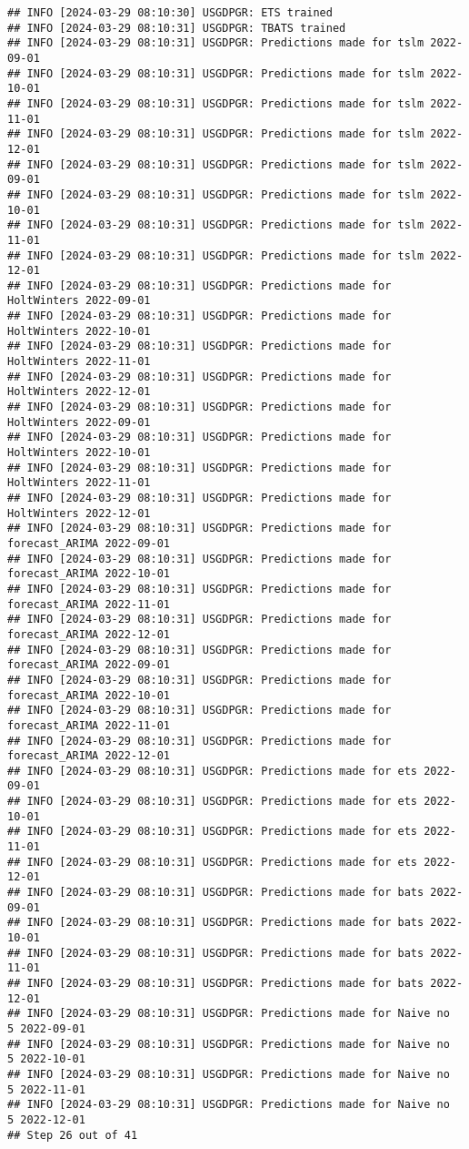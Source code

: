 \documentclass[
]{article}
\begin{document}
\begin{verbatim}
## INFO [2024-03-29 08:10:30] USGDPGR: ETS trained
## INFO [2024-03-29 08:10:31] USGDPGR: TBATS trained
## INFO [2024-03-29 08:10:31] USGDPGR: Predictions made for tslm 2022-09-01
## INFO [2024-03-29 08:10:31] USGDPGR: Predictions made for tslm 2022-10-01
## INFO [2024-03-29 08:10:31] USGDPGR: Predictions made for tslm 2022-11-01
## INFO [2024-03-29 08:10:31] USGDPGR: Predictions made for tslm 2022-12-01
## INFO [2024-03-29 08:10:31] USGDPGR: Predictions made for tslm 2022-09-01
## INFO [2024-03-29 08:10:31] USGDPGR: Predictions made for tslm 2022-10-01
## INFO [2024-03-29 08:10:31] USGDPGR: Predictions made for tslm 2022-11-01
## INFO [2024-03-29 08:10:31] USGDPGR: Predictions made for tslm 2022-12-01
## INFO [2024-03-29 08:10:31] USGDPGR: Predictions made for HoltWinters 2022-09-01
## INFO [2024-03-29 08:10:31] USGDPGR: Predictions made for HoltWinters 2022-10-01
## INFO [2024-03-29 08:10:31] USGDPGR: Predictions made for HoltWinters 2022-11-01
## INFO [2024-03-29 08:10:31] USGDPGR: Predictions made for HoltWinters 2022-12-01
## INFO [2024-03-29 08:10:31] USGDPGR: Predictions made for HoltWinters 2022-09-01
## INFO [2024-03-29 08:10:31] USGDPGR: Predictions made for HoltWinters 2022-10-01
## INFO [2024-03-29 08:10:31] USGDPGR: Predictions made for HoltWinters 2022-11-01
## INFO [2024-03-29 08:10:31] USGDPGR: Predictions made for HoltWinters 2022-12-01
## INFO [2024-03-29 08:10:31] USGDPGR: Predictions made for forecast_ARIMA 2022-09-01
## INFO [2024-03-29 08:10:31] USGDPGR: Predictions made for forecast_ARIMA 2022-10-01
## INFO [2024-03-29 08:10:31] USGDPGR: Predictions made for forecast_ARIMA 2022-11-01
## INFO [2024-03-29 08:10:31] USGDPGR: Predictions made for forecast_ARIMA 2022-12-01
## INFO [2024-03-29 08:10:31] USGDPGR: Predictions made for forecast_ARIMA 2022-09-01
## INFO [2024-03-29 08:10:31] USGDPGR: Predictions made for forecast_ARIMA 2022-10-01
## INFO [2024-03-29 08:10:31] USGDPGR: Predictions made for forecast_ARIMA 2022-11-01
## INFO [2024-03-29 08:10:31] USGDPGR: Predictions made for forecast_ARIMA 2022-12-01
## INFO [2024-03-29 08:10:31] USGDPGR: Predictions made for ets 2022-09-01
## INFO [2024-03-29 08:10:31] USGDPGR: Predictions made for ets 2022-10-01
## INFO [2024-03-29 08:10:31] USGDPGR: Predictions made for ets 2022-11-01
## INFO [2024-03-29 08:10:31] USGDPGR: Predictions made for ets 2022-12-01
## INFO [2024-03-29 08:10:31] USGDPGR: Predictions made for bats 2022-09-01
## INFO [2024-03-29 08:10:31] USGDPGR: Predictions made for bats 2022-10-01
## INFO [2024-03-29 08:10:31] USGDPGR: Predictions made for bats 2022-11-01
## INFO [2024-03-29 08:10:31] USGDPGR: Predictions made for bats 2022-12-01
## INFO [2024-03-29 08:10:31] USGDPGR: Predictions made for Naive no  5 2022-09-01
## INFO [2024-03-29 08:10:31] USGDPGR: Predictions made for Naive no  5 2022-10-01
## INFO [2024-03-29 08:10:31] USGDPGR: Predictions made for Naive no  5 2022-11-01
## INFO [2024-03-29 08:10:31] USGDPGR: Predictions made for Naive no  5 2022-12-01
## Step 26 out of 41
\end{verbatim}
\end{document}
